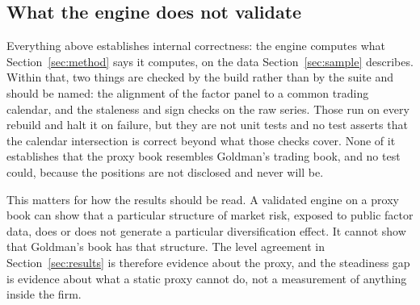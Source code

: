 \subsection{What the engine does not validate}

Everything above establishes internal correctness: the engine computes what
Section~\ref{sec:method} says it computes, on the data
Section~\ref{sec:sample} describes. Within that, two things are checked by the
build rather than by the suite and should be named: the alignment of the factor
panel to a common trading calendar, and the staleness and sign checks on the
raw series. Those run on every rebuild and halt it on failure, but they are not
unit tests and no test asserts that the calendar intersection is correct beyond
what those checks cover. None of it establishes that the proxy book
resembles Goldman's trading book, and no test could, because the positions are
not disclosed and never will be.

This matters for how the results should be read. A validated engine on a proxy
book can show that a particular structure of market risk, exposed to public
factor data, does or does not generate a particular diversification effect.
It cannot show that Goldman's book has that structure. The level agreement in
Section~\ref{sec:results} is therefore evidence about the proxy, and the
steadiness gap is evidence about what a static proxy cannot do, not a
measurement of anything inside the firm.
